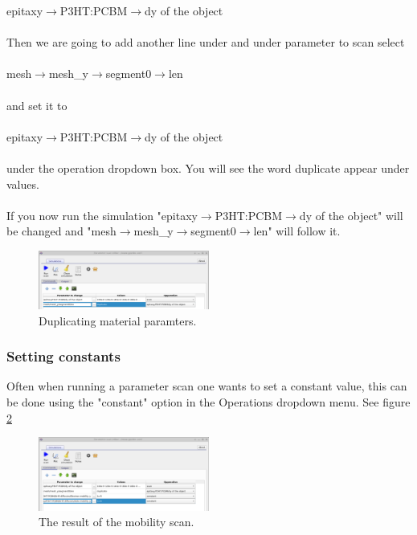 epitaxy$\rightarrow$P3HT:PCBM$\rightarrow$dy of the object
\\
\\
Then we are going to add another line under and under parameter to scan select
\\
\\
mesh$\rightarrow$mesh\_y$\rightarrow$segment0$\rightarrow$len
\\
\\
and set it to
\\
\\
epitaxy$\rightarrow$P3HT:PCBM$\rightarrow$dy of the object
\\
\\
under the operation dropdown box. You will see the word duplicate appear under values.
\\
\\
If you now run the simulation "epitaxy$\rightarrow$P3HT:PCBM$\rightarrow$dy of the object" will be changed and "mesh$\rightarrow$mesh\_y$\rightarrow$segment0$\rightarrow$len" will follow it.


\begin{figure}[H]
\centering
\includegraphics[width=0.5\textwidth]{./images/param_scan_duplicate.png}
\caption{Duplicating material paramters.}
\label{fig:scanduplicate}
\end{figure}

\subsubsection{Setting constants}
Often when running a parameter scan one wants to set a constant value, this can be done using the "constant" option in the Operations dropdown menu. See figure \ref{fig:scanconst}

\begin{figure}[H]
\centering
\includegraphics[width=0.5\textwidth]{./images/param_scan_const.png}
\caption{The result of the mobility scan.}
\label{fig:scanconst}
\end{figure}


